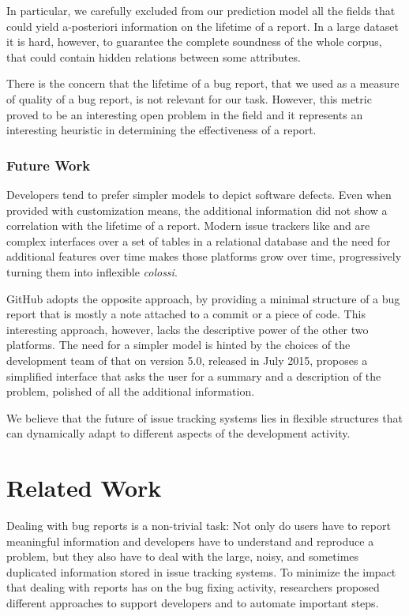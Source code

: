 In particular, we carefully excluded from our prediction model all the fields that could yield a-posteriori information on the lifetime of a report.
In a large dataset it is hard, however, to guarantee the complete soundness of the whole corpus, that could contain hidden relations between some attributes.

There is the concern that the lifetime of a bug report, that we used as a measure of quality of a bug report, is not relevant for our task.
However, this metric proved to be an interesting open problem in the field and it represents an interesting heuristic in determining the effectiveness of a report.


\subsubsection{Future Work}

Developers tend to prefer simpler models to depict software defects.
Even when provided with customization means, the additional information did not show a correlation with the lifetime of a report.
Modern issue trackers like \jira and \bzilla are complex interfaces over a set of tables in a relational database and the need for additional features over time makes those platforms grow over time, progressively turning them into inflexible \emph{colossi}.

GitHub adopts the opposite approach, by providing a minimal structure of a bug report that is mostly a note attached to a commit or a piece of code.
This interesting approach, however, lacks the descriptive power of the other two platforms.
The need for a simpler model is hinted by the choices of the development team of \bzilla that on version 5.0, released in July 2015, proposes a simplified interface that asks the user for a summary and a description of the problem, polished of all the additional information.

We believe that the future of issue tracking systems lies in flexible structures that can dynamically adapt to different aspects of the development activity.


\section{Related Work} \label{sec:model-related}

Dealing with bug reports is a non-trivial task: Not only do users have to report meaningful information and developers have to understand and reproduce a problem, but they also have to deal with the large, noisy, and sometimes duplicated  information stored in issue tracking systems.
To minimize the impact that dealing with reports has on the bug fixing activity, researchers proposed different approaches to support developers and to automate important steps.

